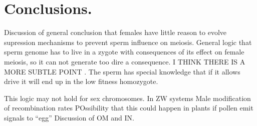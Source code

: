 \documentclass[12pt,letterpaper]{article}
\begin{document}
\section*{Conclusions.}
Discussion of general conclusion that females have little reason to evolve supression mechanisms to prevent sperm influence on meiosis. 
General logic that sperm genome has to live in a zygote with consequences of its effect on female meiosis, so
it can not generate too dire a consequence.
I THINK THERE IS A MORE SUBTLE POINT . The sperm has special knowledge that if it allows drive it will end up in the low fitness homozygote. 


This logic may not hold for sex chromosomes. In ZW systems 
 Male modification of recombination rates
POssibility that this could happen in plants if pollen emit signals to ``egg''
Discussion of OM and IN.


\end{document}
